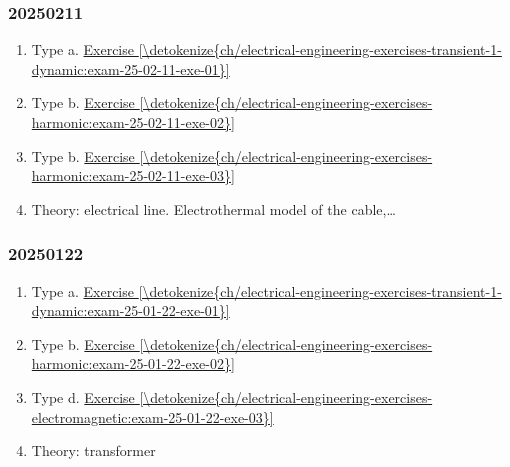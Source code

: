 \documentclass[letterpaper,10pt,english]{jupyterBook}
\begin{document}
\sphinxAtStartPar
{}
\subsubsection*{2025\sphinxhyphen{}02\sphinxhyphen{}11}
\begin{enumerate}
%
\item {} 
\sphinxAtStartPar
Type a. \hyperref[\detokenize{ch/electrical-engineering-exercises-transient-1-dynamic:exam-25-02-11-exe-01}]{Exercise \ref{\detokenize{ch/electrical-engineering-exercises-transient-1-dynamic:exam-25-02-11-exe-01}}}

\item {} 
\sphinxAtStartPar
Type b. \hyperref[\detokenize{ch/electrical-engineering-exercises-harmonic:exam-25-02-11-exe-02}]{Exercise \ref{\detokenize{ch/electrical-engineering-exercises-harmonic:exam-25-02-11-exe-02}}}

\item {} 
\sphinxAtStartPar
Type b. \hyperref[\detokenize{ch/electrical-engineering-exercises-harmonic:exam-25-02-11-exe-03}]{Exercise \ref{\detokenize{ch/electrical-engineering-exercises-harmonic:exam-25-02-11-exe-03}}}

\item {} 
\sphinxAtStartPar
Theory: electrical line. Electro\sphinxhyphen{}thermal model of the cable,…

\end{enumerate}
\subsubsection*{2025\sphinxhyphen{}01\sphinxhyphen{}22}
\begin{enumerate}
%
\item {} 
\sphinxAtStartPar
Type a. \hyperref[\detokenize{ch/electrical-engineering-exercises-transient-1-dynamic:exam-25-01-22-exe-01}]{Exercise \ref{\detokenize{ch/electrical-engineering-exercises-transient-1-dynamic:exam-25-01-22-exe-01}}}

\item {} 
\sphinxAtStartPar
Type b. \hyperref[\detokenize{ch/electrical-engineering-exercises-harmonic:exam-25-01-22-exe-02}]{Exercise \ref{\detokenize{ch/electrical-engineering-exercises-harmonic:exam-25-01-22-exe-02}}}

\item {} 
\sphinxAtStartPar
Type d. \hyperref[\detokenize{ch/electrical-engineering-exercises-electromagnetic:exam-25-01-22-exe-03}]{Exercise \ref{\detokenize{ch/electrical-engineering-exercises-electromagnetic:exam-25-01-22-exe-03}}}

\item {} 
\sphinxAtStartPar
Theory: transformer

\end{enumerate}
\end{document}
